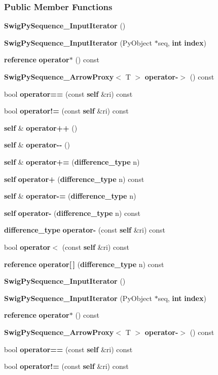 \subsubsection*{Public Member Functions}
\begin{DoxyCompactItemize}
\item 
{\bf Swig\+Py\+Sequence\+\_\+\+Input\+Iterator} ()
\item 
{\bf Swig\+Py\+Sequence\+\_\+\+Input\+Iterator} (Py\+Object $\ast$seq, {\bf int} {\bf index})
\item 
{\bf reference} {\bf operator$\ast$} () const 
\item 
{\bf Swig\+Py\+Sequence\+\_\+\+Arrow\+Proxy}$<$ T $>$ {\bf operator-\/$>$} () const 
\item 
bool {\bf operator==} (const {\bf self} \&ri) const 
\item 
bool {\bf operator!=} (const {\bf self} \&ri) const 
\item 
{\bf self} \& {\bf operator++} ()
\item 
{\bf self} \& {\bf operator-\/-\/} ()
\item 
{\bf self} \& {\bf operator+=} ({\bf difference\+\_\+type} n)
\item 
{\bf self} {\bf operator+} ({\bf difference\+\_\+type} n) const 
\item 
{\bf self} \& {\bf operator-\/=} ({\bf difference\+\_\+type} n)
\item 
{\bf self} {\bf operator-\/} ({\bf difference\+\_\+type} n) const 
\item 
{\bf difference\+\_\+type} {\bf operator-\/} (const {\bf self} \&ri) const 
\item 
bool {\bf operator$<$} (const {\bf self} \&ri) const 
\item 
{\bf reference} {\bf operator[$\,$]} ({\bf difference\+\_\+type} n) const 
\item 
{\bf Swig\+Py\+Sequence\+\_\+\+Input\+Iterator} ()
\item 
{\bf Swig\+Py\+Sequence\+\_\+\+Input\+Iterator} (Py\+Object $\ast$seq, {\bf int} {\bf index})
\item 
{\bf reference} {\bf operator$\ast$} () const 
\item 
{\bf Swig\+Py\+Sequence\+\_\+\+Arrow\+Proxy}$<$ T $>$ {\bf operator-\/$>$} () const 
\item 
bool {\bf operator==} (const {\bf self} \&ri) const 
\item 
bool {\bf operator!=} (const {\bf self} \&ri) const 
\item 

\end{DoxyCompactItemize}
